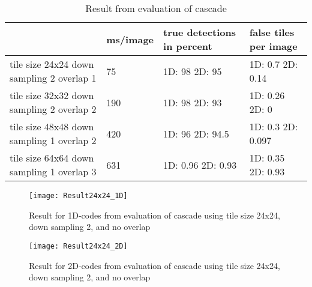 \begin{table}[H]
\begin{center}
     \begin{tabular}{ | p{3cm} | l | p{3cm} | p{2cm}|}
     \hline
      	& ms/image & true detections in percent & false tiles \newline per image \\ \hline
   	 tile size 24x24 \newline down sampling 2 \newline overlap 1 
   	 & 75 & 1D: 98 \newline 2D: 95 & 1D: 0.7 \newline 2D: 0.14 				\\ \hline
     tile size 32x32 \newline down sampling 2 \newline overlap 2 
     & 190 & 1D: 98 \newline 2D: 93 & 1D: 0.26 \newline 2D: 0				\\ \hline
     tile size 48x48 \newline down sampling 1 \newline overlap 2 
     & 420    & 1D: 96 \newline 2D: 94.5 & 1D: 0.3 \newline 2D: 0.097
     \\ \hline
     tile size 64x64 \newline down sampling 1 \newline overlap 3 
     & 631 & 1D: 0.96 \newline 2D: 0.93 & 1D: 0.35 \newline 2D: 0.93		 \\ \hline
     \end{tabular}
\end{center}
\caption{Result from evaluation of cascade}
\end{table}

\begin{figure}[H]
\centering
	\texttt{[image: Result24x24\_1D]}
	\caption{Result for 1D-codes from evaluation of cascade using tile size 24x24, down sampling 2, and no overlap}
	\label{Result24x24_1D}
\end{figure}

\begin{figure}[H]
\centering
	\texttt{[image: Result24x24\_2D]}
	\caption{Result for 2D-codes from evaluation of cascade using tile size 24x24, down sampling 2, and no overlap}
	\label{Result24x24_2D}
\end{figure}

